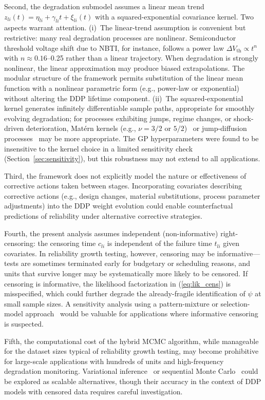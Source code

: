 \documentclass[a4paper,fleqn,longmktitle]{cas-sc}
\begin{document}
Second, the degradation submodel assumes a linear mean trend $z_{li}(t) = \eta_{li} + \gamma_{li}t + \xi_{li}(t)$ with a squared-exponential covariance kernel. Two aspects warrant attention. (i)~The linear-trend assumption is convenient but restrictive: many real degradation processes are nonlinear. Semiconductor threshold voltage shift due to NBTI, for instance, follows a power law $\Delta V_{\text{th}} \propto t^n$ with $n \approx 0.16$--0.25 rather than a linear trajectory. When degradation is strongly nonlinear, the linear approximation may produce biased extrapolations. The modular structure of the framework permits substitution of the linear mean function with a nonlinear parametric form (e.g., power-law or exponential) without altering the DDP lifetime component. (ii)~The squared-exponential kernel generates infinitely differentiable sample paths, appropriate for smoothly evolving degradation; for processes exhibiting jumps, regime changes, or shock-driven deterioration, Mat\'{e}rn kernels (e.g., $\nu=3/2$ or $5/2$)~\cite{Rasmussen2006} or jump-diffusion processes~\cite{Giorgio2024} may be more appropriate. The GP hyperparameters were found to be insensitive to the kernel choice in a limited sensitivity check (Section~\ref{sec:sensitivity}), but this robustness may not extend to all applications.

Third, the framework does not explicitly model the nature or effectiveness of corrective actions taken between stages. Incorporating covariates describing corrective actions (e.g., design changes, material substitutions, process parameter adjustments) into the DDP weight evolution could enable counterfactual predictions of reliability under alternative corrective strategies.

Fourth, the present analysis assumes independent (non-informative) right-censoring: the censoring time $c_{li}$ is independent of the failure time $t_{li}$ given covariates. In reliability growth testing, however, censoring may be informative---tests are sometimes terminated early for budgetary or scheduling reasons, and units that survive longer may be systematically more likely to be censored. If censoring is informative, the likelihood factorization in (\ref{eq:lik_cens}) is misspecified, which could further degrade the already-fragile identification of $\psi$ at small sample sizes. A sensitivity analysis using a pattern-mixture or selection-model approach~\cite{Little1995} would be valuable for applications where informative censoring is suspected.

Fifth, the computational cost of the hybrid MCMC algorithm, while manageable for the dataset sizes typical of reliability growth testing, may become prohibitive for large-scale applications with hundreds of units and high-frequency degradation monitoring. Variational inference~\cite{Blei2017} or sequential Monte Carlo~\cite{Chopin2020} could be explored as scalable alternatives, though their accuracy in the context of DDP models with censored data requires careful investigation.
\end{document}
